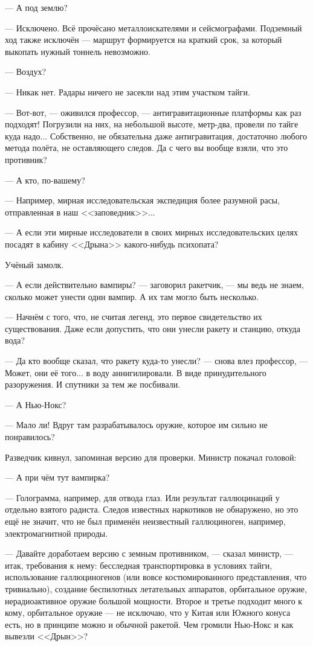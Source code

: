 --- А под землю?

--- Исключено. Всё прочёсано металлоискателями и сейсмографами. Подземный ход также исключён ---
маршрут формируется на краткий срок, за который выкопать нужный тоннель невозможно.

--- Воздух?

--- Никак нет. Радары ничего не засекли над этим участком тайги.

--- Вот-вот, --- оживился профессор, --- антигравитационные платформы как раз подходят!
Погрузили на них, на небольшой высоте, метр-два, провели по тайге куда надо...
Собственно, не обязательна даже антигравитация, достаточно любого метода полёта, не оставляющего следов.
Да с чего вы вообще взяли, что это противник?

--- А кто, по-вашему?

--- Например, мирная исследовательская экспедиция более разумной расы, отправленная в наш <<заповедник>>...

--- А если эти мирные исследователи в своих мирных исследовательских целях посадят в кабину <<Дрына>> какого-нибудь психопата?

Учёный замолк.

--- А если действительно вампиры? --- заговорил ракетчик, --- мы ведь не знаем, сколько может унести один вампир.
А их там могло быть несколько.

--- Начнём с того, что, не считая легенд, это первое свидетельство их существования.
Даже если допустить, что они унесли ракету и станцию, откуда вода?

--- Да кто вообще сказал, что ракету куда-то унесли? --- снова влез профессор, --- Может, они её того...
в воду аннигилировали. В виде принудительного разоружения. И спутники за тем же посбивали.

--- А Нью-Нокс?

--- Мало ли! Вдруг там разрабатывалось оружие, которое им сильно не понравилось?

Разведчик кивнул, запоминая версию для проверки. Министр покачал головой:

--- А при чём тут вампирка?

--- Голограмма, например, для отвода глаз. Или результат галлюцинаций у отдельно взятого радиста.
Следов известных наркотиков не обнаружено, но это ещё не значит, что не был применён неизвестный галлюциноген,
например, электромагнитной природы.

--- Давайте доработаем версию с земным противником, --- сказал министр, --- итак, требования к нему:
бесследная транспортировка в условиях тайги, использование галлюциногенов (или вовсе костюмированного представления,
что тривиально), создание беспилотных летательных аппаратов, орбитальное оружие, нерадиоактивное оружие большой мощности.
Второе и третье подходит много к кому, орбитальное оружие --- не исключаю, что у Китая или Южного конуса есть,
но в принципе можно и обычной ракетой. Чем громили Нью-Нокс и как вывезли <<Дрын>>?

